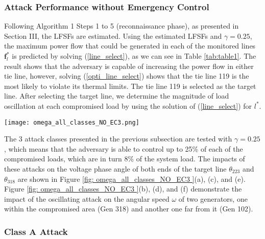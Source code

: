 \documentclass[journal]{IEEEtran}
\begin{document}
\subsubsection{Attack Performance without Emergency Control}
Following Algorithm 1 Steps 1 to 5 (reconnaissance phase), as presented in Section III, the LFSFs are estimated. Using the estimated LFSFs and $\gamma = 0.25$, the maximum power flow that could be generated in each of the monitored lines $\mathbf{f}_l^{*}$ is predicted by solving (\ref{line_select}), as we can see in Table \ref{tab:table1}. The result shows that the adversary is capable of increasing the power flow in either tie line, however, solving (\ref{opti_line_select}) shows that the tie line 119 is the most likely to violate its thermal limits. The tie line 119 is selected as the target line. After selecting the target line, we determine the magnitude of load oscillation at each compromised load by using the solution of (\ref{line_select}) for $l^*$.

\begin{figure*}[t]
\centering
\texttt{[image: omega\_all\_classes\_NO\_EC3.png]}
\caption{Impact of load oscillation attack Class A (a \& b), Class B (c \& d), and Class C (e \& f) on voltage angle for Buses 223 and 318, and angular speed for Generators 102 and 318.}
\label{fig: omega_all_classes_NO_EC3 }
\end{figure*}

The 3 attack classes presented in the previous subsection are tested with $\gamma = 0.25$, which means that the adversary is able to control up to 25\% of each of the compromised loads, which are in turn 8\% of the system load. The impacts of these attacks on the voltage phase angle of both ends of the target line $ \theta_{223}$ and $\theta_{318} $ are shown in Figure \ref{fig: omega_all_classes_NO_EC3 }(a), (c), and (e). Figure \ref{fig: omega_all_classes_NO_EC3 }(b), (d), and (f) demonstrate the impact of the oscillating attack on the angular speed $\omega $ of two generators, one within the compromised area (Gen 318) and another one far from it (Gen 102).

\subsubsection{Class A Attack} 
\end{document}
